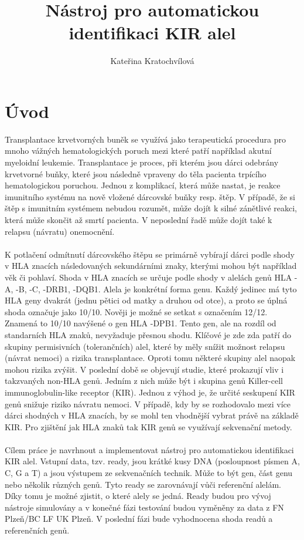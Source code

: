 \documentclass[czech,DP]{thesiskiv}
\author{Kateřina Kratochvílová}
\title{Nástroj pro automatickou identifikaci KIR alel}
\numberwithin{equation}{section}
\begin{document}
%
\maketitle
\tableofcontents

\chapter{Úvod}
Transplantace krvetvorných buněk se využívá jako terapeutická procedura pro mnoho vážných hematologických poruch mezi které patří například akutní myeloidní leukemie. Transplantace je proces, při kterém jsou dárci odebrány krvetvorné buňky, které jsou následně vpraveny do těla pacienta trpícího hematologickou poruchou. Jednou z komplikací, která může nastat, je reakce imunitního systému na nově vložené dárcovské buňky resp. štěp. V případě, že si štěp s imunitním systémem nebudou rozumět, může dojít k silné zánětlivé reakci, která může skončit až smrtí pacienta. V neposlední řadě může dojít také k relapsu (návratu) onemocnění. 
\\
\\
K potlačení odmítnutí dárcovského štěpu se primárně vybírají dárci podle shody v HLA znacích následovaných sekundárními znaky, kterými mohou být například věk či pohlaví. Shoda v HLA znacích se určuje podle shody v alelách genů HLA -A, -B, -C, -DRB1, -DQB1. Alela je konkrétní forma genu. Každý jedinec má tyto HLA geny dvakrát (jednu pětici od matky a druhou od otce), a proto se úplná shoda označuje jako 10/10. Nověji je možné se setkat s označením 12/12. Znamená to 10/10 navýšené o gen HLA -DPB1. Tento gen, ale na rozdíl od standarních HLA znaků, nevyžaduje přesnou shodu. Klíčové je zde zda patří do skupiny permisivních (tolerančních) alel, které by měly snížit možnost relapsu (návrat nemoci) a rizika transplantace. Oproti tomu některé skupiny alel naopak mohou rizika zvýšit. V poslední době se objevují studie, které prokazují vliv i takzvaných non-HLA genů. Jedním z nich může být i skupina genů Killer-cell immunoglobulin-like receptor (KIR). Jednou z výhod je, že určité seskupení KIR genů snižuje riziko návratu nemoci. V případě, kdy by se rozhodovalo mezi více dárci shodných v HLA znacích, by se mohl ten vhodnější vybrat právě na základě KIR. Pro zjištění jak HLA znaků tak KIR genů se využívají sekvenační metody. \cite{KIR_transplantace_jindra} \cite{Frycova_bakalarka} \cite{DPB1_houdova}
\\
\\
Cílem práce je navrhnout a implementovat nástroj pro automatickou identifikaci KIR alel. Vstupní data, tzv. ready, jsou krátké kusy DNA (posloupnost písmen A, C, G a T) a jsou výstupem ze sekvenačních technik. Může to být gen, část genu nebo několik různých genů. Tyto ready se zarovnávají vůči referenční alelám. Díky tomu je možné zjistit, o které alely se jedná. Ready budou pro vývoj nástroje simulovány a v konečné fázi testování budou vyměněny za data z FN Plzeň/BC LF UK Plzeň. V poslední fázi bude vyhodnocena shoda readů a referenčních genů.
\end{document}
